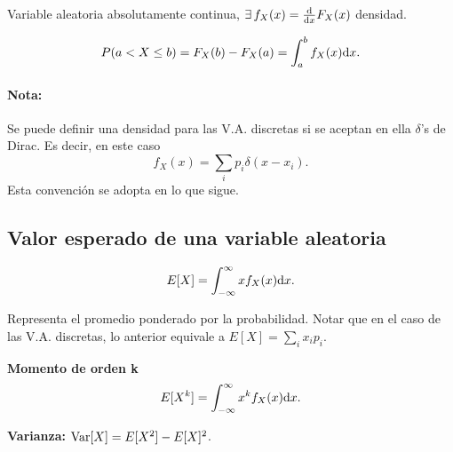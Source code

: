 \begin{ejemplo}
    Variable aleatoria absolutamente continua, $\exists\, f_X(x)=\frac{\mathrm{d}{}}{\mathrm{d}{} x}F_X(x)$ densidad.
    \begin{figure}[htb]
        \hfil
        \endpgfgraphicnamed
        \hfill
        \endpgfgraphicnamed
        \hfil
    \end{figure}
    \FloatBarrier

    \[P(a<X\leq b) = F_X(b)-F_X(a) = \int_a^b f_X(x)\mathrm{d} x.\]
\end{ejemplo}

\paragraph{Nota:} Se puede definir una densidad para las V.A. discretas si se
aceptan en ella $\delta$'s de Dirac. Es decir, en este caso \[
 f_X(x)=\sum_i p_i \delta(x-x_i).\]
 Esta convención se adopta en lo que sigue.

\subsection*{Valor esperado de una variable aleatoria}
\[
E[X] =\int_{-\infty}^\infty x f_X(x)\mathrm{d} x. \]

Representa el promedio ponderado por la probabilidad. Notar que en
el caso de las V.A. discretas, lo anterior equivale a
$E[X]=\sum_i x_ip_i$.

{\bf Momento de orden k}
\[E[X^k]=\int_{-\infty}^\infty x^kf_X(x)\mathrm{d} x. \]

{\bf Varianza:}  $\operatorname{Var}[X]=E[X^2]-E[X]^2$.

